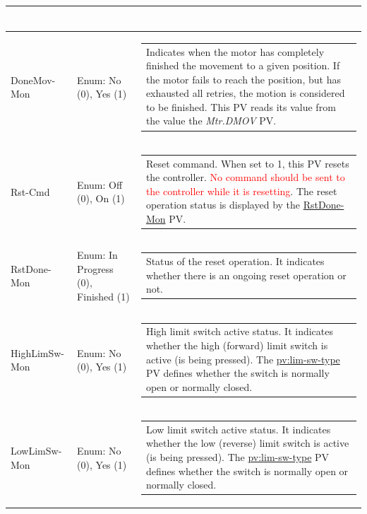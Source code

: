 \documentclass[openany]{article}
\begin{document}
\begin{longtable}{| m{4.5cm} m{2.5cm}  m{8.5cm} |}
\begin{tabular}{@{}m{6cm}@{}}
            \end{tabular} \hypertarget{pv:done-mov-mon}{}\\ \hline
        DoneMov-Mon & Enum: No (0), Yes (1) & \begin{tabular}{@{}m{6cm}@{}}
                Indicates when the motor has completely finished the movement to a given position. If the motor fails to reach the position, but has exhausted all retries, the motion is considered to be finished. This PV reads its value from the value the \emph{Mtr.DMOV} PV.
            \end{tabular} \hypertarget{pv:rst-cmd}{}\\ \hline
        Rst-Cmd & Enum: Off (0), On (1) & \begin{tabular}{@{}m{6cm}@{}}
                Reset command. When set to 1, this PV resets the controller. \textcolor{red}{No command should be sent to the controller while it is resetting}. The reset operation status is displayed by the \hyperlink{pv:rst-done-mon}{RstDone-Mon} PV.
            \end{tabular} \hypertarget{pv:rst-done-mon}{}\\ \hline
        RstDone-Mon & Enum: In Progress (0), Finished (1) & \begin{tabular}{@{}m{6cm}@{}}
                Status of the reset operation. It indicates whether there is an ongoing reset operation or not.
            \end{tabular} \hypertarget{pv:high-lim-sw-mon}{}\\ \hline
        HighLimSw-Mon & Enum: No (0), Yes (1) & \begin{tabular}{@{}m{6cm}@{}}
                High limit switch active status. It indicates whether the high (forward) limit switch is active (is being pressed). The \hyperlink{limit switch type}{pv:lim-sw-type} PV defines whether the switch is normally open or normally closed.
            \end{tabular} \hypertarget{pv:low-lim-sw-mon}{}\\ \hline
        LowLimSw-Mon & Enum: No (0), Yes (1) & \begin{tabular}{@{}m{6cm}@{}}
                Low limit switch active status. It indicates whether the low (reverse) limit switch is active (is being pressed). The \hyperlink{limit switch type}{pv:lim-sw-type} PV defines whether the switch is normally open or normally closed.
            \end{tabular} \hypertarget{pv:enc-pos-mon}{}\\ \hline

\end{longtable}
\end{document}

